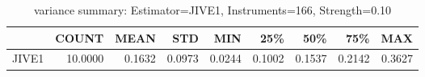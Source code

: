 \begin{table}[ht]
\centering
\caption{variance summary: Estimator=JIVE1, Instruments=166, Strength=0.10}
\begin{tabular}{lrrrrrrrr}
\toprule
 & COUNT & MEAN & STD & MIN & 25\% & 50\% & 75\% & MAX \\
\midrule
JIVE1 & 10.0000 & 0.1632 & 0.0973 & 0.0244 & 0.1002 & 0.1537 & 0.2142 & 0.3627 \\
\bottomrule
\end{tabular}
\end{table}
